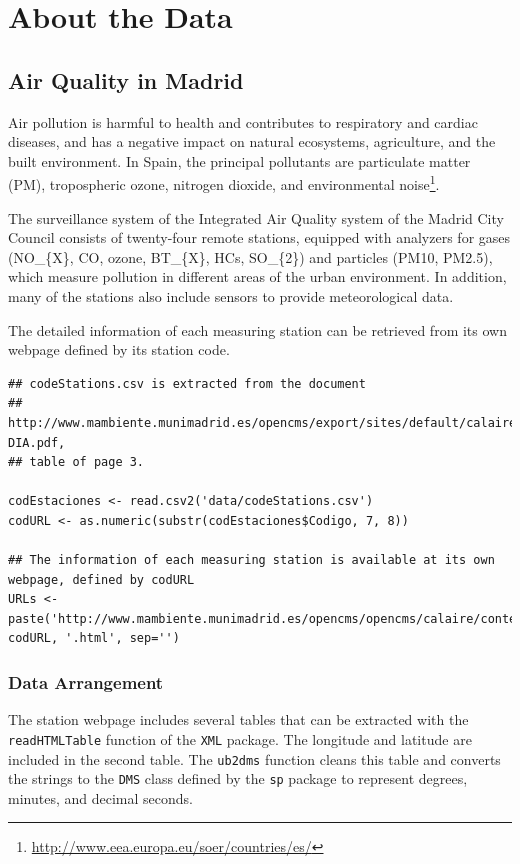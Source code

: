 \documentclass[smallroyalvopaper]{memoir}
\begin{document}
\chapter{About the Data}
\label{sec:orgheadline36}
\label{cha:dataSpatial}

\section{Air Quality in Madrid}
\label{sec-1}
\label{sec:airQualityData}

Air pollution is harmful to health and contributes to respiratory and
cardiac diseases, and has a negative impact on natural ecosystems,
agriculture, and the built environment. In Spain, the principal
pollutants are particulate matter (PM), tropospheric ozone, nitrogen
dioxide, and environmental noise\footnote{\url{http://www.eea.europa.eu/soer/countries/es/}}.

The surveillance system of the Integrated Air Quality system of the
Madrid City Council consists of twenty-four remote stations, equipped
with analyzers for gases (NO\_\{X\}, CO, ozone, BT\_\{X\}, HCs, SO\_\{2\}) and
particles (PM10, PM2.5), which measure pollution in different areas of
the urban environment. In addition, many of the stations also include
sensors to provide meteorological data.

The detailed information of each measuring station can be retrieved
from its own webpage defined by its station code.
\lstset{language=R,numbers=none}
\begin{lstlisting}
## codeStations.csv is extracted from the document
## http://www.mambiente.munimadrid.es/opencms/export/sites/default/calaire/Anexos/INTPHORA-DIA.pdf,
## table of page 3.

codEstaciones <- read.csv2('data/codeStations.csv')
codURL <- as.numeric(substr(codEstaciones$Codigo, 7, 8))

## The information of each measuring station is available at its own webpage, defined by codURL
URLs <- paste('http://www.mambiente.munimadrid.es/opencms/opencms/calaire/contenidos/estaciones/estacion', codURL, '.html', sep='')
\end{lstlisting}

\subsection{\floweroneleft Data Arrangement}
\label{sec-1-1}
The station webpage includes several tables that can be extracted with
the \texttt{readHTMLTable} function of the \texttt{XML} package.  The longitude and
latitude are included in the second table. The \texttt{ub2dms} function
cleans this table and converts the strings to the \texttt{DMS} class defined
by the \texttt{sp} package to represent degrees, minutes, and decimal
seconds.
\end{document}
